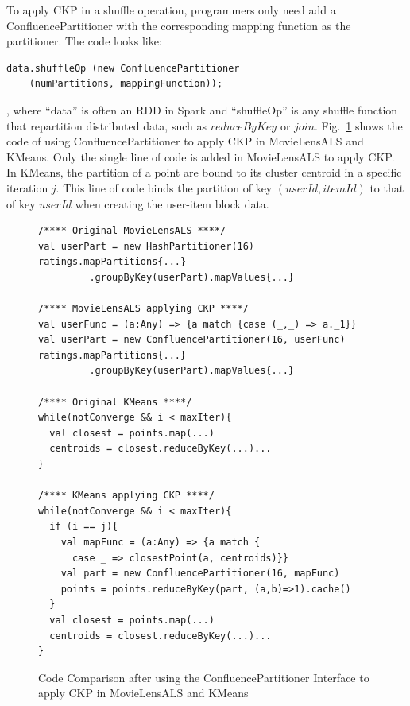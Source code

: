 \documentclass[10pt,journal,compsoc]{IEEEtran}
\makeatletter
\newcommand{\removelatexerror}{\let\@latex@error\@gobble}
\makeatother
\begin{document}

To apply CKP in a shuffle operation, programmers only need 
add a ConfluencePartitioner with the corresponding 
mapping function as the partitioner. 
The code looks like:
\begin{lstlisting}
data.shuffleOp (new ConfluencePartitioner 
    (numPartitions, mappingFunction));
\end{lstlisting}
, where ``data'' is often an RDD in Spark and ``shuffleOp'' is any shuffle function that repartition distributed data, such as $reduceByKey$ or $join$. 
Fig.~\ref{fig:code} shows the code of using ConfluencePartitioner
to apply CKP in MovieLensALS and KMeans.
Only the single line of code is added in MovieLensALS to apply CKP.
In KMeans, the partition of a point are bound to its cluster 
centroid in a specific iteration $j$.
This line of code binds the partition of key $(userId, itemId)$
to that of key $userId$ when creating the user-item block data.


\begin{figure}[!t]
\removelatexerror
\begin{lstlisting}
/**** Original MovieLensALS ****/
val userPart = new HashPartitioner(16)
ratings.mapPartitions{...}
         .groupByKey(userPart).mapValues{...}

/**** MovieLensALS applying CKP ****/
val userFunc = (a:Any) => {a match {case (_,_) => a._1}}
val userPart = new ConfluencePartitioner(16, userFunc)
ratings.mapPartitions{...}
         .groupByKey(userPart).mapValues{...}

/**** Original KMeans ****/
while(notConverge && i < maxIter){
  val closest = points.map(...)
  centroids = closest.reduceByKey(...)...
}

/**** KMeans applying CKP ****/
while(notConverge && i < maxIter){
  if (i == j){
    val mapFunc = (a:Any) => {a match {
      case _ => closestPoint(a, centroids)}}
    val part = new ConfluencePartitioner(16, mapFunc)
    points = points.reduceByKey(part, (a,b)=>1).cache()
  }
  val closest = points.map(...)
  centroids = closest.reduceByKey(...)...
}

\end{lstlisting}
\caption{Code Comparison after using the ConfluencePartitioner Interface to apply CKP in MovieLensALS and KMeans}
\label{fig:code}
\end{figure}
\end{document}
